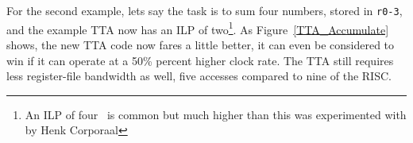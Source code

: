\begin{table}[h!]
\begin{center}
\caption[A simple addition operation to demonstrate the TTA concept]{A simple
addition operation to demonstrate the TTA concept. The addition is only
initiated once a write is made to the addition-trigger register (add$_t$).}
\label{TTA_Simple_Add}
\end{center}
\end{table}


For the second example, lets say the task is to sum four numbers, stored in
\texttt{r0-3}, and the example TTA now has an ILP of two\footnote{An ILP of
four~\cite{corporaal1993maa} is common but much higher than this was experimented
with by Henk Corporaal\cite{corporaal1993maa}}. As Figure~\ref{TTA_Accumulate}
shows, the new TTA code now fares a little better, it can even be considered to
win if it can operate at a 50\% percent higher clock rate. The TTA still requires
less register-file bandwidth as well, five accesses compared to nine of the RISC.

